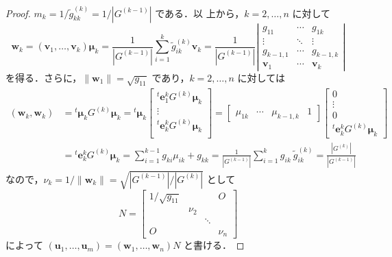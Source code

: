\documentclass[11pt, uplatex, dvipdfmx]{jsarticle}
\theoremstyle{definition}
\begin{document}
\begin{proof}
  $m_k = 1/\tilde{g}^{(k)}_{kk} = 1/\left|G^{(k-1)}\right|$ である．以
  上から，$k=2, \ldots, n$ に対して
  \[
    \bm{w}_k = (\bm{v}_1, \ldots, \bm{v}_k) \bm{\mu}_k
    = \frac{1}{\left| G^{(k-1)} \right|} \sum_{i=1}^{k} \tilde{g}^{(k)}_{ik} \bm{v}_k
    = \frac{1}{\left|G^{(k-1)} \right|}\left|
      \begin{array}{ccc}
        g_{11} & \cdots & g_{1k}\\
        \vdots & \ddots & \vdots\\
        g_{k-1,1} & \cdots & g_{k-1,k}\\
        \bm{v}_1 & \cdots & \bm{v}_k
      \end{array}
    \right|
  \]
  を得る．さらに，$\|\bm{w}_1\| = \sqrt{g_{11}}$ であり，$k=2, \ldots, n$ に対しては
  \[
    \begin{aligned}
      (\bm{w}_k, \bm{w}_k) &= {}^{t}\bm{\mu}_k G^{(k)} \bm{\mu}_k = {}^{t} \bm{\mu}_k \left[
        \begin{array}{c}
          {}^{t}\bm{e}^k_1 G^{(k)}\bm{\mu}_k\\
          \vdots \\
          {}^{t} \bm{e}^k_{k} G^{(k)}\bm{\mu}_k\\
        \end{array}
      \right] = \left[
        \begin{array}{cccc}
          \mu_{1k} & \cdots & \mu_{k-1,k} & 1
        \end{array}
      \right] \left[
        \begin{array}{c}
          0\\
          \vdots\\
          0\\
          {}^{t}\bm{e}^k_k G^{(k)}\bm{\mu}_k
        \end{array}
      \right]\\
      &= {}^{t} \bm{e}^k_k G^{(k)}\bm{\mu}_k = \sum_{i=1}^{k-1} g_{ki} \mu_{ik} + g_{kk}
      = \frac{1}{\left| G^{(k-1)}\right|}\sum_{i=1}^{k}g_{ik} ~ \tilde{g}^{(k)}_{ik}
      = \frac{\left| G^{(k)}\right|}{\left|G^{(k-1)}\right|}
    \end{aligned}
  \]
  なので，$\nu_k = 1/\|\bm{w}_k\| = \sqrt{\left|G^{(k-1)}\right|/\left|G^{(k)}\right|}$ として
  \[
    N = \left[
      \begin{array}{cccc}
        1/\sqrt{g_{11}} & & & O\\
                       & \nu_2 & & \\
                       & & \ddots & \\
        O & & & \nu_n
      \end{array}
    \right]
  \]
  によって $(\bm{u}_1, \ldots, \bm{u}_m) = (\bm{w}_1, \ldots, \bm{w}_n) N$ と書ける．
\end{proof}
\end{document}
